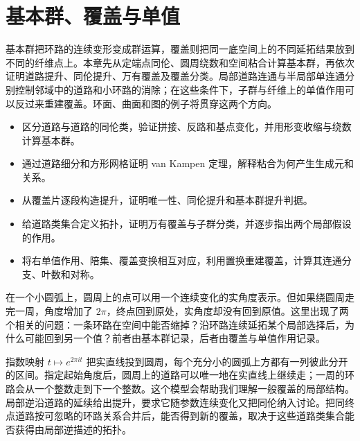 
% 
% 

\chapter{基本群、覆盖与单值}
\label{g1:ch:05}

\begin{chapterabstract}
	基本群把环路的连续变形变成群运算，覆盖则把同一底空间上的不同延拓结果放到不同的纤维点上。本章先从定端点同伦、圆周绕数和空间粘合计算基本群，再依次证明道路提升、同伦提升、万有覆盖及覆盖分类。局部道路连通与半局部单连通分别控制邻域中的道路和小环路的消除；在这些条件下，子群与纤维上的单值作用可以反过来重建覆盖。环面、曲面和图的例子将贯穿这两个方向。
\end{chapterabstract}

\begin{learninggoals}
	\begin{itemize}
		\item 区分道路与道路的同伦类，验证拼接、反路和基点变化，并用形变收缩与绕数计算基本群。
		\item 通过道路细分和方形网格证明 van Kampen 定理，解释粘合为何产生生成元和关系。
		\item 从覆盖片逐段构造提升，证明唯一性、同伦提升和基本群提升判据。
		\item 给道路类集合定义拓扑，证明万有覆盖与子群分类，并逐步指出两个局部假设的作用。
		\item 将右单值作用、陪集、覆盖变换相互对应，利用置换重建覆盖，计算其连通分支、叶数和对称。
	\end{itemize}
\end{learninggoals}

在一个小圆弧上，圆周上的点可以用一个连续变化的实角度表示。但如果绕圆周走完一周，角度增加了 \(2\pi\)，终点回到原处，实角度却没有回到原值。这里出现了两个相关的问题：一条环路在空间中能否缩掉？沿环路连续延拓某个局部选择后，为什么可能回到另一个值？前者由基本群记录，后者由覆盖与单值作用记录。

\ProseParagraphBreak

指数映射 \(t\mapsto e^{2\pi it}\) 把实直线投到圆周，每个充分小的圆弧上方都有一列彼此分开的区间。指定起始角度后，圆周上的道路可以唯一地在实直线上继续走；一周的环路会从一个整数走到下一个整数。这个模型会帮助我们理解一般覆盖的局部结构。局部逆沿道路的延续给出提升，要求它随参数连续变化又把同伦纳入讨论。把同终点道路按可忽略的环路关系合并后，能否得到新的覆盖，取决于这些道路类集合能否获得由局部逆描述的拓扑。

